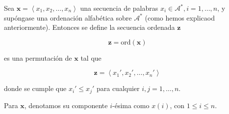Sea \(\boldsymbol{x} = \left\langle x_1,x_2,\dots,x_n\right\rangle\) una
secuencia de palabras \(x_i\in\mathcal{A}^*,i=1,\dots,n\), y supóngase
una ordenación alfabética sobre \(\mathcal{A}^*\) (como hemos explicaod
anteriormente). Entonces se define la secuencia ordenada
\(\boldsymbol{z}\)

\[
\boldsymbol{z} = \text{ord}\left(\boldsymbol{x}\right)
\]

es una permutación de \(\boldsymbol{x}\) tal que

\[
\boldsymbol{z} = \left\langle x_1',x_2',\dots,x_n'\right\rangle
\]

donde se cumple que \(x_i' \leq x_j'\) para cualquier \(i,j=1,\dots,n\).

Para \(\boldsymbol{x}\), denotamos su componente \(i\)-ésima como
\(x(i)\), con \(1\leq i\leq n\).
